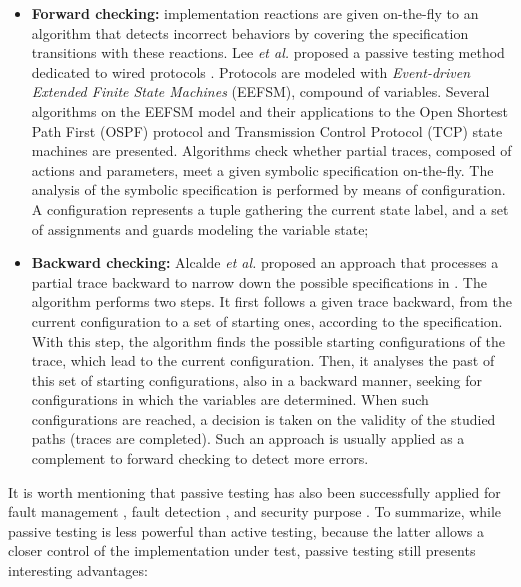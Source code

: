 \begin{itemize}
    \item \textbf{Forward checking:} implementation reactions are
        given on-the-fly to an algorithm that detects incorrect
        behaviors by covering the specification transitions with
        these reactions. Lee \emph{et al.} proposed a passive
        testing method dedicated to wired protocols
        \cite{1621118}.  Protocols are modeled with
        \textit{Event-driven Extended Finite State Machines}
        (EEFSM), compound of variables.  Several algorithms on
        the EEFSM model and their applications to the Open
        Shortest Path First (OSPF) protocol and Transmission
        Control Protocol (TCP) state machines are presented.
        Algorithms check whether partial traces, composed of
        actions and parameters, meet a given symbolic
        specification on-the-fly. The analysis of the symbolic
        specification is performed by means of configuration. A
        configuration represents a tuple gathering the current
        state label, and a set of assignments and guards modeling
        the variable state;

    \item \textbf{Backward checking:} Alcalde \emph{et al.}
        proposed an approach that processes a partial trace
        backward to narrow down the possible specifications in
        \cite{alcalde2004network}. The algorithm performs two
        steps. It first follows a given trace backward, from the
        current configuration to a set of starting ones,
        according to the specification. With this step, the
        algorithm finds the possible starting configurations of
        the trace, which lead to the current configuration. Then,
        it analyses the past of this set of starting
        configurations, also in a backward manner, seeking for
        configurations in which the variables are determined.
        When such configurations are reached, a decision is taken
        on the validity of the studied paths (traces are
        completed). Such an approach is usually applied as a
        complement to forward checking to detect more errors.
\end{itemize}

It is worth mentioning that passive testing has also been
successfully applied for fault management \cite{965909}, fault
detection \cite{Ural:2007:IAP:1270230.1270259}, and security
purpose \cite{4698175}. To summarize, while passive testing is
less powerful than active testing, because the latter allows a
closer control of the implementation under test, passive testing
still presents interesting advantages:

